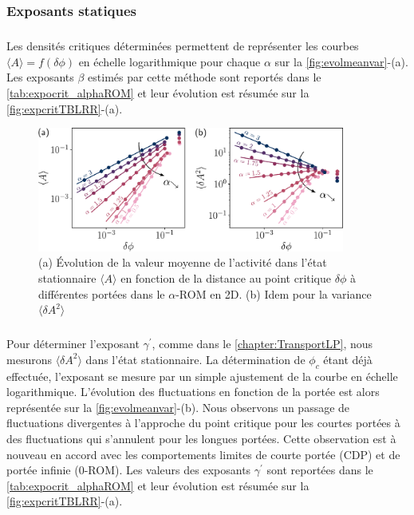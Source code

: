 \subsubsection{Exposants statiques}

\label{sec:TBLRRStat}

\subparagraph{}Les densités critiques déterminées permettent de représenter les courbes $\langle A \rangle = f(\delta\phi)$ en échelle logarithmique pour chaque $\alpha$ sur la \autoref{fig:evolmeanvar}-(a). Les exposants $\beta$ estimés par cette méthode sont reportés dans le \autoref{tab:expocrit_alphaROM} et leur évolution est résumée sur la \autoref{fig:expcritTBLRR}-(a).

\begin{figure}[h]
	\centering
	\includegraphics[width=0.9\textwidth]{Chapitre3/Figures/BetaGamma/EvolMeanVar_edited.pdf}
	\caption{(a) Évolution de la valeur moyenne de l'activité dans l'état stationnaire $\langle A \rangle$ en fonction de la distance au point critique $\delta\phi$ à différentes portées dans le $\alpha$-ROM en 2D. (b) Idem pour la variance $\langle \delta A^2 \rangle$}
	\label{fig:evolmeanvar}
\end{figure}

\subparagraph{}Pour déterminer l'exposant $\gamma^\prime$, comme dans le \autoref{chapter:TransportLP}, nous mesurons $\langle \delta A^2\rangle$ dans l'état stationnaire. La détermination de $\phi_c$ étant déjà effectuée, l'exposant se mesure par un simple ajustement de la courbe en échelle logarithmique. L'évolution des fluctuations en fonction de la portée est alors représentée sur la \autoref{fig:evolmeanvar}-(b). Nous observons un passage de fluctuations divergentes à l'approche du point critique pour les courtes portées à des fluctuations qui s'annulent pour les longues portées. Cette observation est à nouveau en accord avec les comportements limites de courte portée (CDP) et de portée infinie ($0$-ROM). Les valeurs des exposants $\gamma^\prime$ sont reportées dans le \autoref{tab:expocrit_alphaROM} et leur évolution est résumée sur la \autoref{fig:expcritTBLRR}-(a).

